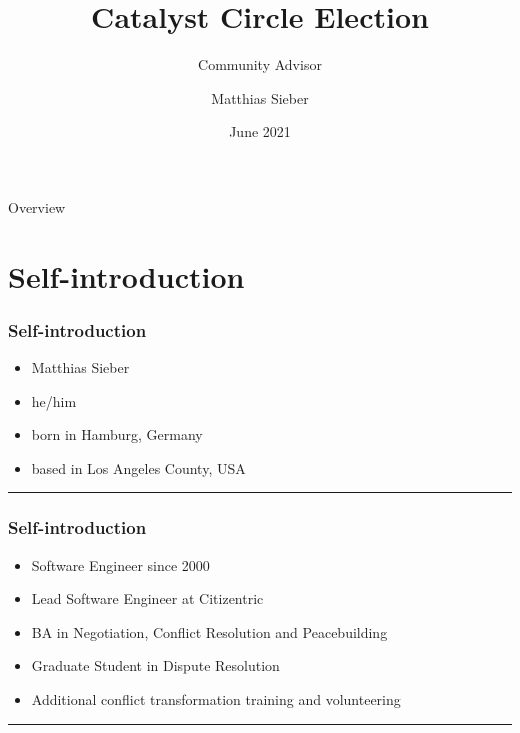 \documentclass[aspectratio=169,12pt]{beamer}
\title{Catalyst Circle Election}
\subtitle{Community Advisor}
\author{Matthias Sieber}
\date{June 2021}
\begin{document}
\frame{\titlepage}

\begin{frame}{Overview}
\tableofcontents
\end{frame}

\section{Self-introduction}
\begin{frame}
	\frametitle{Self-introduction}
	\begin{minipage}{0.47\textwidth}
		\begin{itemize}
			\item Matthias Sieber
            \item he/him
			\item born in Hamburg, Germany
			\item based in Los Angeles County, USA
		\end{itemize}
	\end{minipage}
	\begin{minipage}{0.5\textwidth}
		\rule{\textwidth}{0.75\textwidth}
	\end{minipage}
\end{frame}

\begin{frame}
	\frametitle{Self-introduction}
	\begin{minipage}{0.47\textwidth}
		\begin{itemize}
            \item Software Engineer since 2000
            \item Lead Software Engineer at Citizentric
            \item BA in Negotiation, Conflict Resolution and Peacebuilding
            \item Graduate Student in Dispute Resolution
            \item Additional conflict transformation training and volunteering
		\end{itemize}
	\end{minipage}
	\begin{minipage}{0.5\textwidth}
		\rule{\textwidth}{0.75\textwidth}
	\end{minipage}
\end{frame}
\end{document}

